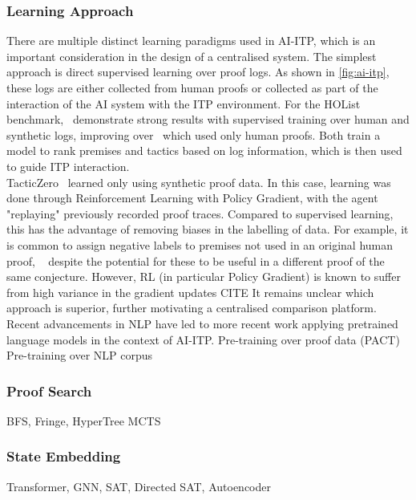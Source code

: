 \documentclass[letterpaper]{article} %
\begin{document}
    \subsubsection{Learning Approach}
    There are multiple distinct learning paradigms used in AI-ITP, which is an important consideration in the design of a centralised system.
    The simplest approach is direct supervised learning over proof logs.
    As shown in \ref{fig:ai-itp},
    these logs are either collected from human proofs or collected as part of the interaction of the AI system with the ITP environment.
    For the HOList benchmark,~\cite{bansal_learning_2019} demonstrate strong results with supervised training over human and synthetic logs,
    improving over~\cite{paliwal_graph_2019} which used only human proofs.
    Both train a model to rank premises and tactics based on log information, which is then used to guide ITP interaction. \\

    TacticZero~\cite{wu_tacticzero_2021} learned only using synthetic proof data.
    In this case, learning was done through Reinforcement Learning with Policy Gradient,
    with the agent "replaying" previously recorded proof traces.
    Compared to supervised learning, this has the advantage of removing biases in the labelling of data.
    For example, it is common to assign negative labels to premises not used in an original human proof,
    ~\cite{kaliszyk_holstep_2017, kaliszyk_mizar_2015, bansal_holist_2019}
    despite the potential for these to be useful in a different proof of the same conjecture.
    However, RL (in particular Policy Gradient) is known to suffer from high variance in the gradient updates CITE
    It remains unclear which approach is superior, further motivating a centralised comparison platform. \\

    Recent advancements in NLP have led to more recent work applying pretrained language models in the context of AI-ITP.
    Pre-training over proof data (PACT)
    Pre-training over NLP corpus

    \subsubsection{Proof Search}
    BFS, Fringe, HyperTree MCTS

    \subsubsection{State Embedding}
    Transformer, GNN, SAT, Directed SAT, Autoencoder
\end{document}
